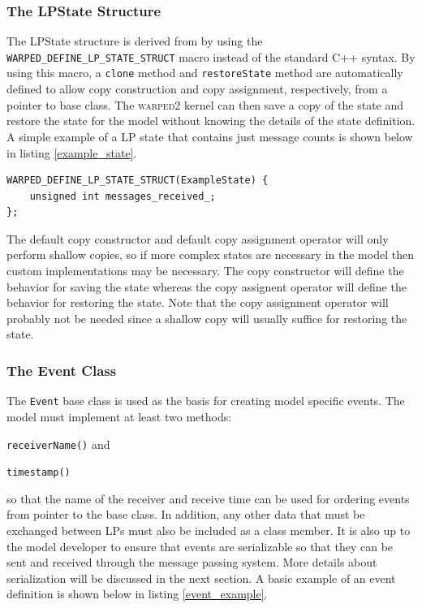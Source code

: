 \documentclass[11pt]{book}
\begin{document}
\subsubsection{The LPState Structure}

The LPState structure is derived from by using the \texttt{WARPED\_DEFINE\_LP\_STATE\_STRUCT}
macro instead of the standard C++ syntax. By using this macro, a \texttt{clone} method and
\texttt{restoreState} method are automatically defined to allow copy construction and copy
assignment, respectively, from a pointer to base class. The \textsc{warped2} kernel can then
save a copy of the state and restore the state for the model without knowing the details of the
state definition. A simple example of a LP state that contains just message counts is shown below
in listing \ref{example_state}.

\begin{lstlisting}[caption=Example \textsc{warped2} State Definition, label=example_state, float]
WARPED_DEFINE_LP_STATE_STRUCT(ExampleState) {
    unsigned int messages_received_;
};
\end{lstlisting}

The default copy constructor and default copy assignment operator will only perform shallow
copies, so if more complex states are necessary in the model then custom implementations may
be necessary. The copy constructor will define the behavior for saving the state whereas the
copy assignent operator will define the behavior for restoring the state.  Note that the
copy assignment operator will probably not be needed since a shallow copy will usually
suffice for restoring the state.

\subsubsection{The Event Class}

The \texttt{Event} base class is used as the basis for creating model specific events.  The model
must implement at least two methods: \begin{inparaenum}[(1)] \item \texttt{receiverName()} and 
\item \texttt{timestamp()} \end{inparaenum} so that the name of the receiver and receive time
can be used for ordering events from pointer to the base class. In addition, any other data
that must be exchanged between LPs must also be included as a class member. It is also up to
the model developer to ensure that events are serializable so that they can be sent and received
through the message passing system.  More details about serialization will be discussed in the
next section. A basic example of an event definition is shown below in listing \ref{event_example}.
\end{document}
